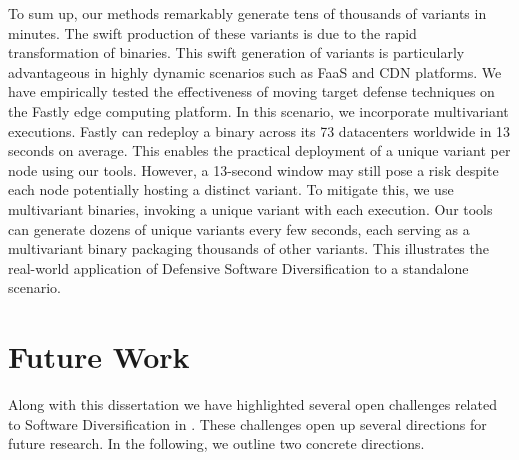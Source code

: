 To sum up, our methods remarkably generate tens of thousands of variants in minutes. 
The swift production of these variants is due to the rapid transformation of \Wasm binaries. 
This swift generation of variants is particularly advantageous in highly dynamic scenarios such as FaaS and CDN platforms. 
We have empirically tested the effectiveness of moving target defense techniques\cite{jackson2011compiler} on the Fastly edge computing platform. 
In this scenario, we incorporate multivariant executions\cite{MEWE}. 
Fastly can redeploy a \Wasm binary across its 73 datacenters worldwide in 13 seconds on average. 
This enables the practical deployment of a unique variant per node using our tools. 
However, a 13-second window may still pose a risk despite each node potentially hosting a distinct \Wasm variant. 
To mitigate this, we use multivariant binaries, invoking a unique variant with each execution. 
Our tools can generate dozens of unique variants every few seconds, each serving as a multivariant binary packaging thousands of other variants. 
This illustrates the real-world application of Defensive Software Diversification to a \Wasm standalone scenario.







\section{Future Work}

Along with this dissertation we have highlighted several open challenges related to Software Diversification in \Wasm.
These challenges open up several directions for future research.
In the following, we outline two concrete directions.



